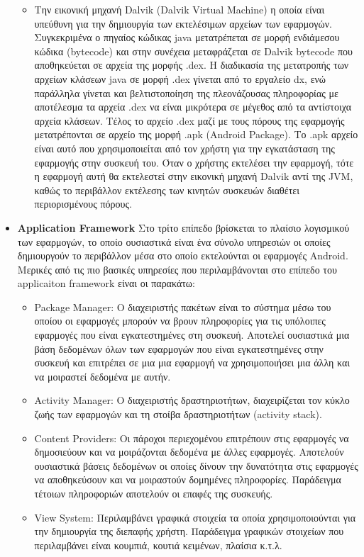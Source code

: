 \begin{itemize}
\begin{itemize}
		 		\item Την εικονική μηχανή Dalvik (Dalvik Virtual Machine) η οποία είναι υπεύθυνη για την δημιουργία των εκτελέσιμων αρχείων των εφαρμογών. Συγκεκριμένα ο πηγαίος κώδικας java μετατρέπεται σε μορφή ενδιάμεσου κώδικα (bytecode) και στην συνέχεια μεταφράζεται σε Dalvik bytecode που αποθηκεύεται σε αρχεία της μορφής .dex. Η διαδικασία της μετατροπής των αρχείων κλάσεων java σε μορφή .dex γίνεται από το εργαλείο dx, ενώ παράλληλα γίνεται και βελτιστοποίηση της πλεονάζουσας πληροφορίας με αποτέλεσμα τα αρχεία .dex να είναι μικρότερα σε μέγεθος από τα αντίστοιχα αρχεία κλάσεων. Τέλος το αρχείο .dex μαζί με τους πόρους της εφαρμογής μετατρέπονται σε αρχείο της μορφή .apk (Android Package). Το .apk αρχείο είναι αυτό που χρησιμοποιείται από τον χρήστη για την εγκατάσταση της εφαρμογής στην συσκευή του. Όταν ο χρήστης εκτελέσει την εφαρμογή, τότε η εφαρμογή αυτή θα εκτελεστεί στην εικονική μηχανή Dalvik αντί της JVM, καθώς το περιβάλλον εκτέλεσης των κινητών συσκευών διαθέτει περιορισμένους πόρους.
		 	\end{itemize}
		 	\item \textbf{Application Framework} Στο τρίτο επίπεδο βρίσκεται το πλαίσιο λογισμικού των εφαρμογών, το οποίο ουσιαστικά είναι ένα σύνολο υπηρεσιών οι οποίες δημιουργούν το περιβάλλον μέσα στο οποίο εκτελούνται οι εφαρμογές Android. Μερικές από τις πιο βασικές υπηρεσίες που περιλαμβάνονται στο επίπεδο του applicaiton framework είναι οι παρακάτω:
		 	\begin{itemize}
		 		\item Package Manager: Ο διαχειριστής πακέτων είναι το σύστημα μέσω του οποίου οι εφαρμογές μπορούν να βρουν πληροφορίες για τις υπόλοιπες εφαρμογές που είναι εγκατεστημένες στη συσκευή. Αποτελεί ουσιαστικά μια βάση δεδομένων όλων των εφαρμογών που είναι εγκατεστημένες στην συσκευή και επιτρέπει σε μια μια εφαρμογή να χρησιμοποιήσει μια άλλη και να μοιραστεί δεδομένα με αυτήν.
		 		\item Activity Manager: Ο διαχειριστής δραστηριοτήτων, διαχειρίζεται τον κύκλο ζωής των εφαρμογών και τη στοίβα δραστηριοτήτων (activity stack).
		 		\item Content Providers: Οι πάροχοι περιεχομένου επιτρέπουν στις εφαρμογές να δημοσιεύουν και να μοιράζονται δεδομένα με άλλες εφαρμογές. Αποτελούν ουσιαστικά βάσεις δεδομένων οι οποίες δίνουν την δυνατότητα στις εφαρμογές να αποθηκεύσουν και να μοιραστούν δομημένες πληροφορίες. Παράδειγμα τέτοιων πληροφοριών αποτελούν οι επαφές της συσκευής.
		 		\item View System: Περιλαμβάνει γραφικά στοιχεία τα οποία χρησιμοποιούνται για την δημιουργία της διεπαφής χρήστη. Παράδειγμα γραφικών στοιχείων που περιλαμβάνει είναι κουμπιά, κουτιά κειμένων, πλαίσια κ.τ.λ.

\end{itemize}
\end{itemize}

